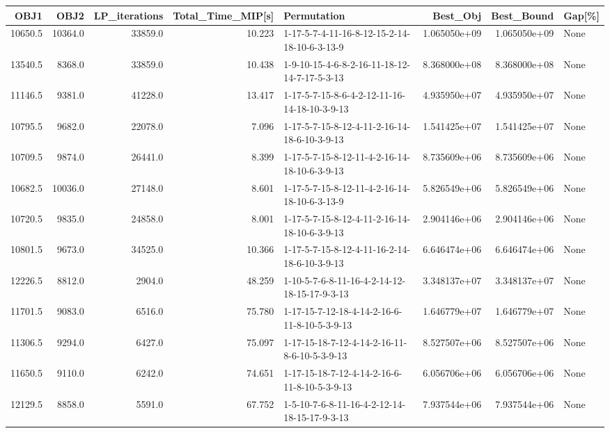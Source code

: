 \begin{tabular}{rrrrlrrl}
\toprule
    OBJ1 &     OBJ2 &  LP\_iterations &  Total\_Time\_MIP[s] &                                   Permutation &      Best\_Obj &    Best\_Bound & Gap[\%] \\
\midrule
 10650.5 &  10364.0 &        33859.0 &             10.223 &  1-17-5-7-4-11-16-8-12-15-2-14-18-10-6-3-13-9 &  1.065050e+09 &  1.065050e+09 &   None \\
 13540.5 &   8368.0 &        33859.0 &             10.438 &  1-9-10-15-4-6-8-2-16-11-18-12-14-7-17-5-3-13 &  8.368000e+08 &  8.368000e+08 &   None \\
 11146.5 &   9381.0 &        41228.0 &             13.417 &  1-17-5-7-15-8-6-4-2-12-11-16-14-18-10-3-9-13 &  4.935950e+07 &  4.935950e+07 &   None \\
 10795.5 &   9682.0 &        22078.0 &              7.096 &  1-17-5-7-15-8-12-4-11-2-16-14-18-6-10-3-9-13 &  1.541425e+07 &  1.541425e+07 &   None \\
 10709.5 &   9874.0 &        26441.0 &              8.399 &  1-17-5-7-15-8-12-11-4-2-16-14-18-10-6-3-9-13 &  8.735609e+06 &  8.735609e+06 &   None \\
 10682.5 &  10036.0 &        27148.0 &              8.601 &  1-17-5-7-15-8-12-11-4-2-16-14-18-10-6-3-13-9 &  5.826549e+06 &  5.826549e+06 &   None \\
 10720.5 &   9835.0 &        24858.0 &              8.001 &  1-17-5-7-15-8-12-4-11-2-16-14-18-10-6-3-9-13 &  2.904146e+06 &  2.904146e+06 &   None \\
 10801.5 &   9673.0 &        34525.0 &             10.366 &  1-17-5-7-15-8-12-4-11-16-2-14-18-6-10-3-9-13 &  6.646474e+06 &  6.646474e+06 &   None \\
 12226.5 &   8812.0 &         2904.0 &             48.259 &  1-10-5-7-6-8-11-16-4-2-14-12-18-15-17-9-3-13 &  3.348137e+07 &  3.348137e+07 &   None \\
 11701.5 &   9083.0 &         6516.0 &             75.780 &  1-17-15-7-12-18-4-14-2-16-6-11-8-10-5-3-9-13 &  1.646779e+07 &  1.646779e+07 &   None \\
 11306.5 &   9294.0 &         6427.0 &             75.097 &  1-17-15-18-7-12-4-14-2-16-11-8-6-10-5-3-9-13 &  8.527507e+06 &  8.527507e+06 &   None \\
 11650.5 &   9110.0 &         6242.0 &             74.651 &  1-17-15-18-7-12-4-14-2-16-6-11-8-10-5-3-9-13 &  6.056706e+06 &  6.056706e+06 &   None \\
 12129.5 &   8858.0 &         5591.0 &             67.752 &  1-5-10-7-6-8-11-16-4-2-12-14-18-15-17-9-3-13 &  7.937544e+06 &  7.937544e+06 &   None \\

\end{tabular}

